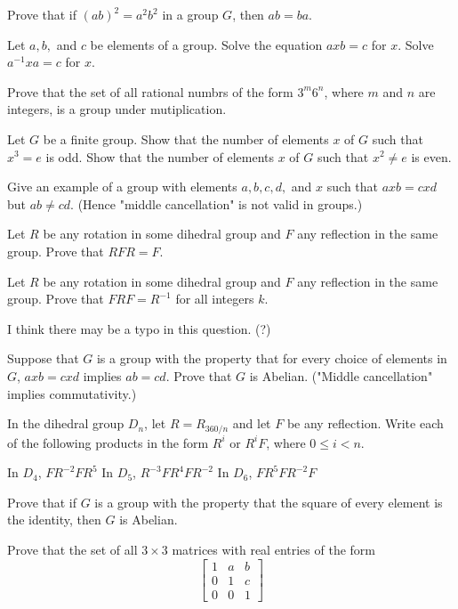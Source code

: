 \documentclass[11pt,largemargins]{homework}
\begin{document}
\raggedright

\question 
Prove that if $(ab)^2=a^2b^2$ in a group $G$, then $ab=ba$.

\question 
Let $a,b,$ and $c$ be elements of a group. Solve the equation $axb=c$ for $x$. Solve $a^{-1}xa=c$ for $x$.

\question 
Prove that the set of all rational numbrs of the form $3^m6^n$, where $m$ and $n$ are integers, is a group under mutiplication.

\question 
Let $G$ be a finite group. Show that the number of elements $x$ of $G$ such that $x^3=e$ is odd. Show that the number of 
elements $x$ of $G$ such that $x^2\neq e$ is even.

\question 
Give an example of a group with elements $a,b,c,d,$ and $x$ such that $axb=cxd$ but $ab\neq cd$. (Hence "middle cancellation" is 
not valid in groups.)

\question 
Let $R$ be any rotation in some dihedral group and $F$ any reflection in the same group. Prove that $RFR=F$.

\question 
Let $R$ be any rotation in some dihedral group and $F$ any reflection in the same group. Prove that $FRF=R^{-1}$ 
for all integers $k$.

\quad I think there may be a typo in this question. (?)

\question 
Suppose that $G$ is a group with the property that for every choice of elements in $G$, $axb=cxd$ implies $ab=cd$. Prove 
that $G$ is Abelian. ("Middle cancellation" implies commutativity.)

\question 
In the dihedral group $D_n$, let $R=R_{360/n}$ and let $F$ be any reflection. Write each of the following products in the 
form $R^i$ or $R^iF$, where $0\leq i < n$. 

\begin{alphaparts}
    \questionpart
    In $D_4$, $FR^{-2}FR^5$
    \questionpart
    In $D_5$, $R^{-3}FR^4FR^{-2}$
    \questionpart
    In $D_6$, $FR^5FR^{-2}F$
\end{alphaparts}
    

\question 
Prove that if $G$ is a group with the property that the square of every element is the identity, then $G$ is Abelian.

\question 
Prove that the set of all $3\times3$ matrices with real entries of the form
\[
\begin{bmatrix}
    1 & a & b \\
    0 & 1 & c \\
    0 & 0 & 1
\end{bmatrix}
\]
\end{document}
